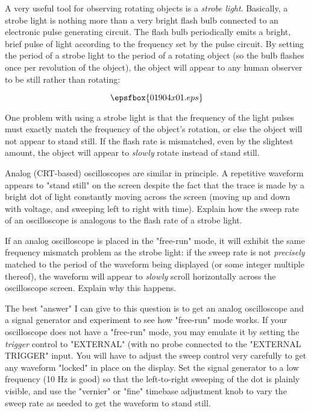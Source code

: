 

A very useful tool for observing rotating objects is a {\it strobe light}.  Basically, a strobe light is nothing more than a very bright flash bulb connected to an electronic pulse generating circuit.  The flash bulb periodically emits a bright, brief pulse of light according to the frequency set by the pulse circuit.  By setting the period of a strobe light to the period of a rotating object (so the bulb flashes once per revolution of the object), the object will appear to any human observer to be still rather than rotating:

$$\epsfbox{01904x01.eps}$$

One problem with using a strobe light is that the frequency of the light pulses must exactly match the frequency of the object's rotation, or else the object will not appear to stand still.  If the flash rate is mismatched, even by the slightest amount, the object will appear to {\it slowly} rotate instead of stand still.

Analog (CRT-based) oscilloscopes are similar in principle.  A repetitive waveform appears to "stand still" on the screen despite the fact that the trace is made by a bright dot of light constantly moving across the screen (moving up and down with voltage, and sweeping left to right with time).  Explain how the sweep rate of an oscilloscope is analogous to the flash rate of a strobe light.

If an analog oscilloscope is placed in the "free-run" mode, it will exhibit the same frequency mismatch problem as the strobe light: if the sweep rate is not {\it precisely} matched to the period of the waveform being displayed (or some integer multiple thereof), the waveform will appear to {\it slowly} scroll horizontally across the oscilloscope screen.  Explain why this happens.







The best "answer" I can give to this question is to get an analog oscilloscope and a signal generator and experiment to see how "free-run" mode works.  If your oscilloscope does not have a "free-run" mode, you may emulate it by setting the {\it trigger} control to "EXTERNAL" (with no probe connected to the "EXTERNAL TRIGGER" input.  You will have to adjust the sweep control very carefully to get any waveform "locked" in place on the display.  Set the signal generator to a low frequency (10 Hz is good) so that the left-to-right sweeping of the dot is plainly visible, and use the "vernier" or "fine" timebase adjustment knob to vary the sweep rate as needed to get the waveform to stand still.

